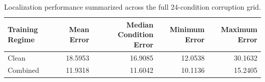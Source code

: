 \begin{table}
\caption{Localization performance summarized across the full 24-condition corruption grid.}
\label{tab:localization_grid}
\begin{tabular}{lrrrr}
\toprule
Training Regime & Mean Error & Median Condition Error & Minimum Error & Maximum Error \\
\midrule
Clean & 18.5953 & 16.9085 & 12.0538 & 30.1632 \\
Combined & 11.9318 & 11.6042 & 10.1136 & 15.2405 \\
\bottomrule
\end{tabular}
\end{table}
